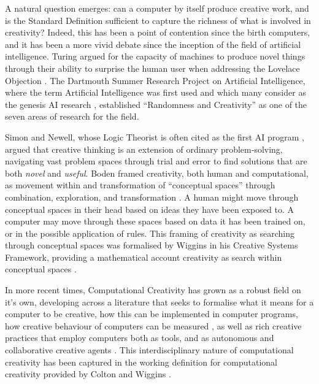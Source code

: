 A natural question emerges: can a computer by itself produce creative work, and is the Standard Definition sufficient to capture the richness of what is involved in creativity? Indeed, this has been a point of contention since the birth computers, and it has been a more vivid debate since the inception of the field of artificial intelligence. Turing argued for the capacity of machines to produce novel things through their ability to surprise the human user when addressing the Lovelace Objection \cite{Turing1950-aq}. The Dartmouth Summer Research Project on Artificial Intelligence, where the term Artificial Intelligence was first used and which many consider as the genesis AI research \cite{McCarthy1955-ls}, established “Randomness and Creativity” as one of the seven areas of research for the field. 

Simon and Newell, whose Logic Theorist is often cited as the first AI program \cite{Russell2016-oe}, argued that creative thinking is an extension of ordinary problem‑solving, navigating vast problem spaces through trial and error to find solutions that are both \textit{novel} and \textit{useful}\cite{Simon1967-nr}. Boden framed creativity, both human and computational, as movement within and transformation of “conceptual spaces” through combination, exploration, and transformation \cite{Boden2003-hk}. A human might move through conceptual spaces in their head based on ideas they have been exposed to. A computer may move through these spaces based on data it has been trained on, or in the possible application of rules. This framing of creativity as searching through conceptual spaces was formalised by Wiggins in his Creative Systems Framework, providing a mathematical account creativity as search within conceptual spaces  \cite{Wiggins2006-zd}.

In more recent times, Computational Creativity has grown as a robust field on it's own, developing across a literature that seeks to formalise what it means for a computer to be creative, how this can be implemented in computer programs, how creative behaviour of computers can be measured \cite{Ritchie2007-jy, Colton2008-fh, Colton2011-uy, Maher2012-oj, Jordanous2012-kw}, as well as rich creative practices that employ computers both as tools, and as autonomous and collaborative creative agents \cite{Cohen1995-wt, Colton2015-qr, Perez-y-Perez1999-ma, Cope1992-pq, Reichardt1968-eo}. This interdisciplinary nature of computational creativity has been captured in the working definition for computational creativity provided by Colton and Wiggins \cite{Colton2021-bt}.

